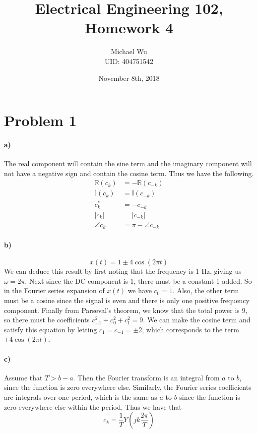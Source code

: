 \documentclass[12pt]{article}
\begin{document}
\title{Electrical Engineering 102, Homework 4}
\date{November 8th, 2018}
\author{Michael Wu\\UID: 404751542}
\maketitle

\section*{Problem 1}

\paragraph{a)}

The real component will contain the sine term and the imaginary component will not have a negative
sign and contain the cosine term. Thus we have the following.
\begin{align*}
    \mathbb{R}(c_k)&=-\mathbb{R}(c_{-k})\\
    \mathbb{I}(c_k)&=\mathbb{I}(c_{-k})\\
    c_k^*&=-c_{-k}\\
    |c_k|&=|c_{-k}|\\
    \angle c_k&=\pi-\angle c_{-k}
\end{align*}

\paragraph{b)}

\[x(t)=1\pm4\cos(2\pi t)\]
We can deduce this result by first noting that the frequency is \(1\) Hz, giving us \(\omega = 2\pi\).
Next since the DC component is 1, there must be a constant 1 added. So in the Fourier series expansion
of \(x(t)\) we have \(c_0=1\). Also, the other term must be a cosine since the signal is even and there is
only one positive frequency component. Finally from Parseval's theorem, we know that the total power is 9,
so there must be coefficients \(c_{-1}^2+c_0^2+c_1^2=9\). We can make the cosine term and satisfy this
equation by letting \(c_1=c_{-1}=\pm 2\), which corresponds to the term \(\pm 4\cos(2\pi t)\).

\paragraph{c)}

Assume that \(T>b-a\). Then the Fourier transform is an integral from \(a\) to \(b\), since the function is zero everywhere
else. Similarly, the Fourier series coefficients are integrals over one period, which is the same as \(a\) to \(b\) since
the function is zero everywhere else within the period. Thus we have that
\[c_k=\frac{1}{T}Y\left(jk\frac{2\pi}{T}\right)\]
\end{document}
